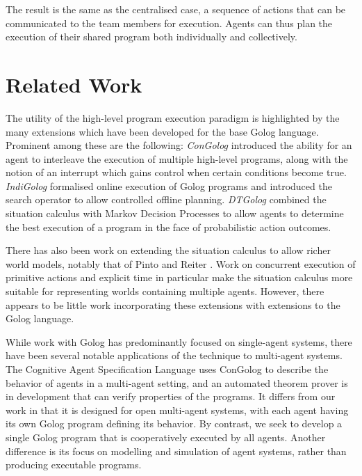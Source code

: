 \documentclass{llncs}
\begin{document}


The result is the same as the centralised case, a sequence of actions
that can be communicated to the team members for execution. Agents
can thus plan the execution of their shared program both individually
and collectively. 


\section{Related Work}

\label{sec:Other-Work}

The utility of the high-level program execution paradigm is highlighted
by the many extensions which have been developed for the base Golog
language. Prominent among these are the following: \emph{ConGolog}
\cite{giacomo00congolog} introduced the ability for an agent to interleave
the execution of multiple high-level programs, along with the notion
of an interrupt which gains control when certain conditions become
true. \emph{IndiGolog} \cite{giacomo99indigolog} formalised online
execution of Golog programs and introduced the search operator to
allow controlled offline planning. \emph{DTGolog} \cite{boutilier00dtgolog}
combined the situation calculus with Markov Decision Processes to
allow agents to determine the best execution of a program in the face
of probabilistic action outcomes.

There has also been work on extending the situation calculus to allow
richer world models, notably that of Pinto \cite{pinto94temporal}
and Reiter \cite{reiter96sc_nat_conc}. Work on concurrent execution
of primitive actions and explicit time in particular make the situation
calculus more suitable for representing worlds containing multiple
agents. However, there appears to be little work incorporating these
extensions with extensions to the Golog language.

While work with Golog has predominantly focused on single-agent systems,
there have been several notable applications of the technique to multi-agent
systems. The Cognitive Agent Specification Language \cite{shapiro02}
uses ConGolog to describe the behavior of agents in a multi-agent
setting, and an automated theorem prover is in development that can
verify properties of the programs. It differs from our work in that
it is designed for open multi-agent systems, with each agent having
its own Golog program defining its behavior. By contrast, we seek
to develop a single Golog program that is cooperatively executed by
all agents. Another difference is its focus on modelling and simulation
of agent systems, rather than producing executable programs.
\end{document}
